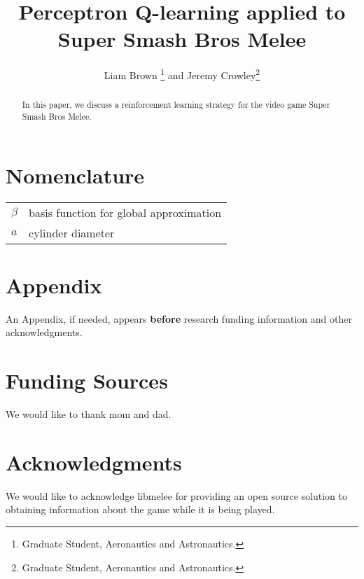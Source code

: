 \documentclass[journal]{new-aiaa}
\title{Perceptron Q-learning applied to Super Smash Bros Melee}
\author{Liam Brown \footnote{Graduate Student, Aeronautics and Astronautics.} and Jeremy Crowley\footnote{Graduate Student, Aeronautics and Astronautics.}}
\affil{Stanford University, Stanford, CA, 94305}
\begin{document}
\maketitle

\begin{abstract}
In this paper, we discuss a reinforcement learning strategy for the video game Super Smash Bros Melee. 
\end{abstract}

\section*{Nomenclature}

{\renewcommand\arraystretch{1.0}
\noindent\begin{longtable*}{@{}l @{\quad=\quad} l@{}}
$\beta$  & basis function for global approximation \\
$a$ &    cylinder diameter \\
\end{longtable*}}


%
%



%
%



%
%



%
%



%
%



%
%



%
%
\section*{Appendix}

An Appendix, if needed, appears \textbf{before} research funding information and other acknowledgments.


%
%
\section*{Funding Sources}

We would like to thank mom and dad.


%
%
\section*{Acknowledgments}

We would like to acknowledge libmelee for providing an open source solution to obtaining information about the game while it is being played.



\end{document}
